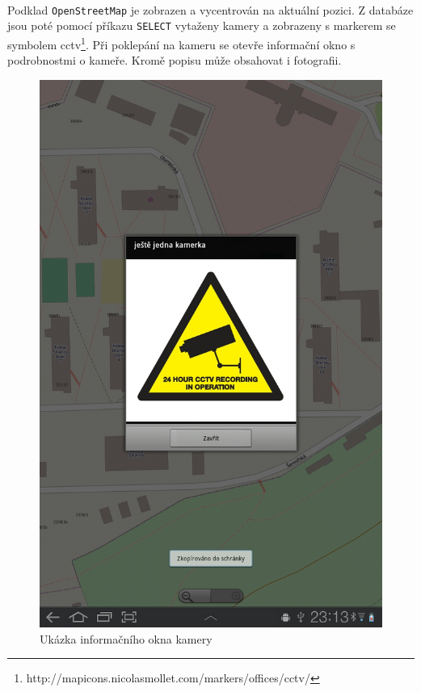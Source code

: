 \paragraph{}
Podklad \texttt{OpenStreetMap} je zobrazen a vycentrován na aktuální pozici. Z databáze jsou poté pomocí příkazu \texttt{SELECT} vytaženy kamery a zobrazeny s markerem se symbolem cctv\footnote{http://mapicons.nicolasmollet.com/markers/offices/cctv/}. Při poklepání na kameru se otevře informační okno s podrobnostmi o kameře. Kromě popisu může obsahovat i fotografii.
\begin{figure}[!ht]
\begin{center}
\includegraphics[scale=0.07]{pics/infoWindow.jpg}
\caption{Ukázka informačního okna kamery}
\end{center}
\end{figure}

